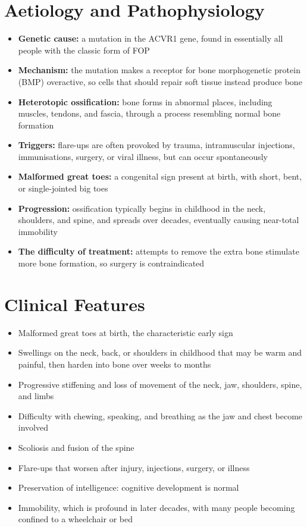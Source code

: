 \section*{Aetiology and Pathophysiology}
\begin{itemize}
    \item \textbf{Genetic cause:} a mutation in the ACVR1 gene, found in essentially all people with the classic form of FOP
    \item \textbf{Mechanism:} the mutation makes a receptor for bone morphogenetic protein (BMP) overactive, so cells that should repair soft tissue instead produce bone
    \item \textbf{Heterotopic ossification:} bone forms in abnormal places, including muscles, tendons, and fascia, through a process resembling normal bone formation
    \item \textbf{Triggers:} flare-ups are often provoked by trauma, intramuscular injections, immunisations, surgery, or viral illness, but can occur spontaneously
    \item \textbf{Malformed great toes:} a congenital sign present at birth, with short, bent, or single-jointed big toes
    \item \textbf{Progression:} ossification typically begins in childhood in the neck, shoulders, and spine, and spreads over decades, eventually causing near-total immobility
    \item \textbf{The difficulty of treatment:} attempts to remove the extra bone stimulate more bone formation, so surgery is contraindicated
\end{itemize}

\section*{Clinical Features}
\begin{itemize}
    \item Malformed great toes at birth, the characteristic early sign
    \item Swellings on the neck, back, or shoulders in childhood that may be warm and painful, then harden into bone over weeks to months
    \item Progressive stiffening and loss of movement of the neck, jaw, shoulders, spine, and limbs
    \item Difficulty with chewing, speaking, and breathing as the jaw and chest become involved
    \item Scoliosis and fusion of the spine
    \item Flare-ups that worsen after injury, injections, surgery, or illness
    \item Preservation of intelligence: cognitive development is normal
    \item Immobility, which is profound in later decades, with many people becoming confined to a wheelchair or bed
\end{itemize}

